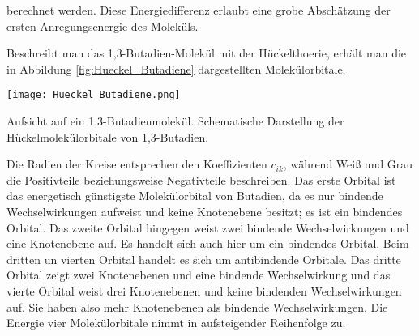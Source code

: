 berechnet werden. Diese Energiedifferenz erlaubt eine grobe Abschätzung der ersten Anregungsenergie des Moleküls.

Beschreibt man das 1,3-Butadien-Molekül mit der Hückelthoerie, erhält man die in Abbildung  \ref{fig:Hueckel_Butadiene} dargestellten Molekülorbitale.

\begin{dsafigure}
 \centering
 \texttt{[image: Hueckel\_Butadiene.png]}
 \caption{Aufsicht auf ein 1,3-Butadienmolekül. Schematische Darstellung der Hückelmolekülorbitale von 1,3-Butadien.}
 \label{fig:Hueckel_Butadiene}
\end{dsafigure}

Die Radien der Kreise entsprechen den Koeffizienten $c_{ik}$, während Weiß und Grau die Positivteile beziehungsweise Negativteile beschreiben. Das erste Orbital ist das energetisch günstigste Molekülorbital von Butadien, da es nur bindende Wechselwirkungen aufweist und keine Knotenebene besitzt; es ist ein bindendes Orbital. Das zweite Orbital hingegen weist zwei bindende Wechselwirkungen und eine Knotenebene auf. Es handelt sich auch hier um ein bindendes Orbital. Beim dritten un vierten Orbital handelt es sich um antibindende Orbitale. Das dritte Orbital zeigt zwei Knotenebenen und eine bindende Wechselwirkung und das vierte Orbital weist drei Knotenebenen und keine bindenden Wechselwirkungen auf. Sie haben also mehr Knotenebenen als bindende Wechselwirkungen. Die Energie vier Molekülorbitale nimmt in aufsteigender Reihenfolge zu.
